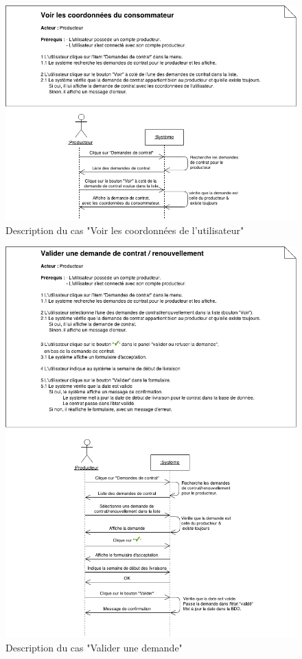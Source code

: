 \documentclass[12pt]{report}
\begin{document}
\begin{figure}[!h]
\centering
\includegraphics[width=1.\textwidth]{./ressources/desc_UC_coo_user.png}
\caption{Description du cas "Voir les coordonnées de l'utilisateur"}
\end{figure}
\clearpage

\begin{figure}[!h]
\centering
\includegraphics[width=1.\textwidth]{./ressources/desc_UC_valider_demande.png}
\caption{Description du cas "Valider une demande"}
\end{figure}
\clearpage
\end{document}
